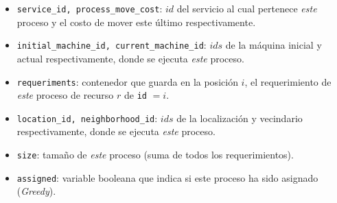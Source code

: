 \documentclass[../informe2.tex]{subfiles}
\begin{document}
\noindent\begin{minipage}{0.4\textwidth}
\end{minipage}\hfill
\begin{minipage}{0.5\textwidth}
	\small
	\begin{itemize}
		\item \texttt{service\_id, process\_move\_cost}: $id$ del servicio al cual pertenece \textit{este} proceso y el costo de mover este último respectivamente.
		\item \texttt{initial\_machine\_id, current\_machine\_id}: $ids$ de la máquina inicial y actual respectivamente, donde se ejecuta \textit{este} proceso.
		\item \texttt{requeriments}: contenedor que guarda en la posición $i$, el requerimiento de \textit{este} proceso de recurso $r$ de \texttt{id} $=i$.
		\item \texttt{location\_id, neighborhood\_id}: $ids$ de la localización y vecindario respectivamente, donde se ejecuta \textit{este} proceso.
		\item \texttt{size}: tamaño de \textit{este} proceso (suma de todos los requerimientos).
		\item \texttt{assigned}: variable booleana que indica si este proceso ha sido asignado (\textit{Greedy}).
	\end{itemize}
\end{minipage}

\bigskip
\end{document}
